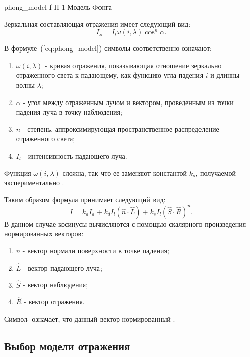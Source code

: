 {phong_model} %
{f} %
{H} %
{1\textwidth} %
{Модель Фонга} %



Зеркальная составляющая отражения имеет следующий вид:
\begin{equation} 
	I_s = I_l\omega(i,\lambda)\cos^n \alpha.
	\label{eq:phong_model}
\end{equation}

В формуле~(\ref{eq:phong_model}) символы соответственно означают:
\begin{enumerate} 
	\item $\omega(i,\lambda)$ - кривая отражения, показывающая отношение зеркально отраженного света к падающему, как функцию угла падения $i$ и длинны волны $\lambda$;
	\item $\alpha$ - угол между отраженным лучом и вектором, проведенным из точки падения луча в точку наблюдения;
	\item $n$ - степень, аппроксимирующая пространственное распределение отраженного света;
	\item $I_l$ - интенсивность падающего луча.
\end{enumerate}
Функция $\omega(i,\lambda)$ сложна, так что ее заменяют константой $k_s$, получаемой экспериментально \cite{Rodgers}.


Таким образом формула принимает следующий вид:
\begin{equation} 
	I = k_aI_a + k_dI_{l}(\hat{n} \cdot \hat{L}) + k_s  I_{l}(\hat{S} \cdot \hat{R})^n.
\end{equation}
В данном случае косинусы вычисляются с помощью скалярного произведения нормированных векторов:
\begin{enumerate}
	\item $\hat{n}$ - вектор нормали поверхности в точке падения;
	\item $\hat{L}$ - вектор падающего луча;
	\item $\hat{S}$ - вектор наблюдения;
	\item $\hat{R}$ - вектор отражения.
\end{enumerate}
Символ $\hat{}$ означает, что данный вектор нормированный \cite{Rodgers}.




\subsection{Выбор модели отражения}

